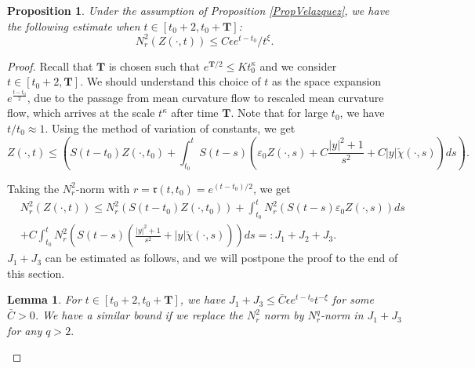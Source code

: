 \documentclass[11pt]{amsart}
\numberwithin{equation}{section}
\newtheorem{proposition}[theorem]{Proposition}
\newtheorem{lemma}[theorem]{Lemma}
\numberwithin{equation}{section}
\newcommand{\eps}{\varepsilon}
\newcommand{\mtr}{\mathfrak{r}}
\begin{document}
	\begin{proposition}\label{prop_OU_var_const}
		Under the assumption of Proposition \ref{PropVelazquez}, we have the following estimate when $t\in[t_0+2,t_0+\mathbf{T}]$: 
		$$N_r^2(Z(\cdot,t))\leq C\epsilon e^{t-t_0}/t^\xi.$$
	\end{proposition}
	\begin{proof}
		
		
		
		Recall that $\mathbf T$ is chosen such that $e^{{\mathbf T}/{2}}\leq  Kt_0^\kappa$ and we consider $t\in [t_0+2,\mathbf T]$. We should understand this choice of $t$ as the space expansion $e^{\frac{t-t_0}{2}}$, due to the passage from mean curvature flow to rescaled mean curvature flow, which arrives at the scale $t^\kappa$ after time $\mathbf T. $
		Note that for large $t_0$, we have $t/t_0\approx 1$. 
		Using the method of variation of constants, we get
		\begin{equation}\label{EqDuHamel}
			Z(\cdot,t)\leq \left(S(t-t_0)Z(\cdot,t_0)+\int_{t_0}^t S(t-s)\left(\eps_0 Z(\cdot,s)+C\frac{|y|^2+1}{s^2}+C|y|\check\chi(\cdot,s)\right)ds  \right).    
		\end{equation}
		
		Taking the $N^2_r$-norm with $r=\mtr(t,t_0)=e^{(t-t_0)/2}$, we get
		\begin{equation}
			\begin{aligned}
				&N_r^2(Z(\cdot,t))\leq N^2_r(S(t-t_0)Z(\cdot,t_0))
				+
				\int_{t_0}^t N^2_r(S(t-s)\eps_0Z(\cdot,s))ds\\
				&+
				C\int_{t_0}^tN^2_r\left(S(t-s)\left(\frac{|y|^2+1}{s^2}+|y|\check\chi(\cdot,s)\right)\right)ds=:J_1+J_2+J_3.
			\end{aligned}
		\end{equation}
		$J_1+J_3$ can be estimated as follows, and we will postpone the proof to the end of this section. 
		\begin{lemma}\label{LmJ134}
			For $t\in[t_0+2,t_0+\mathbf {T}]$, we have $J_1+J_3\leq\bar C\epsilon e^{t-t_0}t^{-\xi}$ for some $\bar C>0$. We have a similar bound if we replace the $N^2_r$ norm by $N^q_r$-norm in $J_1+J_3$ for any $q>2.$
		\end{lemma}
		
		
		

\end{proof}
\end{document}
